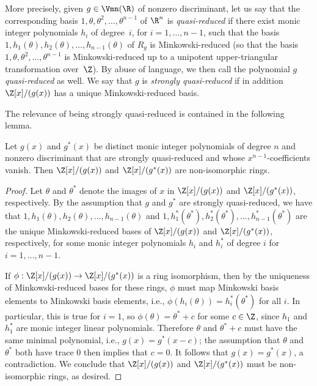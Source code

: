 More precisely, given $g\in \Vmn(\R)$ of nonzero discriminant, let us
say that the corresponding basis
$1,\theta,\theta^2,\ldots,\theta^{n-1}$ of $\R^n$ is {\it
  quasi-reduced} if there exist monic integer polynomials $h_i$ of
degree~$i$, for $i=1,\ldots,n-1$, such that the basis
$1,h_1(\theta),h_2(\theta),\ldots,h_{n-1}(\theta)$ of $R_g$ is
Minkowski-reduced (so that the basis
$1,\theta,\theta^2,\ldots,\theta^{n-1}$ is Minkowski-reduced up to a unipotent
upper-triangular transformation over~$\Z$). By abuse of language, we
then call the polynomial $g$ {\it quasi-reduced} as well. We say that
$g$ is {\it strongly quasi-reduced} if in addition $\Z[x]/(g(x))$ has
a unique Minkowski-reduced basis.

The relevance of being strongly quasi-reduced is contained in the
following lemma.

\begin{lemma}
\notready\label{reducedg}
Let $g(x)$ and $g^*(x)$ be distinct monic integer polynomials of
degree $n$ and nonzero discriminant that are strongly quasi-reduced
and whose $x^{n-1}$-coefficients vanish.  Then $\Z[x]/(g(x))$ and
$\Z[x]/(g^*(x))$ are non-isomorphic rings.
\end{lemma}

\begin{proof}
Let $\theta$ and $\theta^*$ denote the images of $x$ in $\Z[x]/(g(x))$
and $\Z[x]/(g^*(x))$, respectively.  By the assumption that $g$ and
$g^\ast$ are strongly quasi-reduced, we have that
$1,h_1(\theta),h_2(\theta),\ldots,h_{n-1}(\theta)$ and
$1,h_1^*(\theta^*),h_2^*(\theta^*),\ldots,h^*_{n-1}(\theta^*)$ are
the unique Minkowski-reduced bases of $\Z[x]/(g(x))$ and
$\Z[x]/(g^*(x))$, respectively, for some monic integer polynomials
$h_i$ and $h_i^*$ of degree $i$ for $i=1,\ldots,n-1$.

If $\phi:\Z[x]/(g(x))\to\Z[x]/(g^*(x))$ is a ring isomorphism, then by
the uniqueness of Minkowski-reduced bases for these rings, $\phi$ must
map Minkowski basis elements to Minkowski basis elements, i.e.,
$\phi(h_i(\theta))=h_i^*(\theta^*)$ for all $i$.  In particular, this
is true for $i=1$, so $\phi(\theta)=\theta^*+c$ for some $c\in\Z$,
since $h_1$ and $h_1^*$ are monic integer linear polynomials.
Therefore $\theta$ and $\theta^*+c$ must have the same minimal
polynomial, i.e., $g(x)=g^*(x-c)$; the assumption that $\theta$ and
$\theta^*$ both have trace 0 then implies that $c=0$.  It follows that
$g(x)=g^*(x)$, a contradiction.  We conclude that $\Z[x]/(g(x))$ and
$\Z[x]/(g^*(x))$ must be non-isomorphic rings, as desired.
\end{proof}

